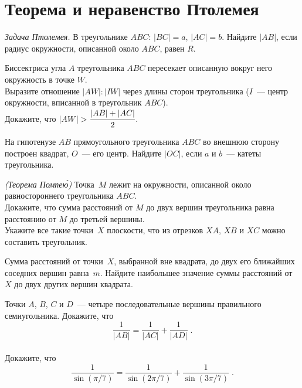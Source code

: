 
\section*{Теорема и неравенство Птолемея}


\begin{problems}

\item\emph{Задача Птолемея.}
В треугольнике $ABC$: $|BC| = a$, $|AC| = b$.
Найдите $|AB|$, если радиус окружности, описанной около $ABC$, равен $R$.

\item
Биссектриса угла $A$ треугольника $ABC$ пересекает описанную вокруг него
окружность в точке $W$.
\\
\sp
Выразите отношение $|AW| : |IW|$ через длины сторон треугольника
($I$~--- центр окружности, вписанной в треугольник $ABC$).
\\[0.5ex]
\sp
Докажите, что $|AW| > \cfrac{|AB| + |AC|}{2}$.

\item
На гипотенузе $AB$ прямоугольного треугольника $ABC$ во внешнюю сторону
построен квадрат, $O$~--- его центр.
Найдите $|OC|$, если $a$ и $b$~--- катеты треугольника.

\item\emph{(Теорема Помпе\'{ю})}
Точка~$M$ лежит на окружности, описанной около равностороннего
треугольника $ABC$.
\\
\sp
Докажите, что сумма расстояний от $M$ до двух вершин треугольника равна
расстоянию от $M$ до третьей вершины.
\\
\sp
Укажите все такие точки~$X$ плоскости, что из отрезков $XA$, $XB$ и $XC$ можно
составить треугольник.

\item
Сумма расстояний от точки~$X$, выбранной вне квадрата, до двух его ближайших
соседних вершин равна~$m$.
Найдите наибольшее значение суммы расстояний от $X$ до двух других вершин
квадрата.

\item
\sp
Точки $A$, $B$, $C$ и $D$~--- четыре последовательные вершины правильного
семиугольника.
Докажите, что
\[
    \frac{1}{|AB|} = \frac{1}{|AC|} + \frac{1}{|AD|}
\;.\]
\\
\sp
Докажите, что
\[
    \frac{1}{\sin (\pi / 7)}
=
    \frac{1}{\sin (2 \pi / 7)}
    +
    \frac{1}{\sin (3 \pi / 7)}
\;.\]


\end{problems}
